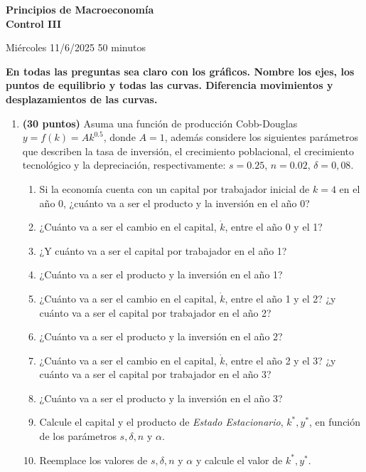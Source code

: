 \documentclass[11pt]{article}
\begin{document}
\begin{center}
{\Large\bfseries Principios de Macroeconomía}\\[2pt]
{\Large\bfseries Control III}
\end{center}

Miércoles 11/6/2025 \hfill 50 minutos

\textbf{En todas las preguntas sea claro con los gráficos. Nombre los ejes, los puntos de equilibrio y todas las curvas. Diferencia movimientos y desplazamientos de las curvas.}

\begin{enumerate}[leftmargin=*, itemsep=10pt]

\item \textbf{(30 puntos)} Asuma una función de producción Cobb-Douglas $y = f(k) = A k^{0.5}$, donde $A = 1$, además considere los siguientes parámetros que describen la tasa de inversión, el crecimiento poblacional, el crecimiento tecnológico y la depreciación, respectivamente: $s = 0.25$, $n = 0.02$, $\delta = 0{,}08$.

\begin{enumerate}[label=(\alph*), itemsep=3pt]
\item Si la economía cuenta con un capital por trabajador inicial de $k = 4$ en el año 0, ¿cuánto va a ser el producto y la inversión en el año 0?
\item ¿Cuánto va a ser el cambio en el capital, $\dot k$, entre el año 0 y el 1?
\item ¿Y cuánto va a ser el capital por trabajador en el año 1?
\item ¿Cuánto va a ser el producto y la inversión en el año 1?
\item ¿Cuánto va a ser el cambio en el capital, $\dot k$, entre el año 1 y el 2? ¿y cuánto va a ser el capital por trabajador en el año 2?
\item ¿Cuánto va a ser el producto y la inversión en el año 2?
\item ¿Cuánto va a ser el cambio en el capital, $\dot k$, entre el año 2 y el 3? ¿y cuánto va a ser el capital por trabajador en el año 3?
\item ¿Cuánto va a ser el producto y la inversión en el año 3?
\item Calcule el capital y el producto de \textit{Estado Estacionario}, $k^{*}, y^{*}$, en función de los parámetros $s, \delta, n$ y $\alpha$.
\item Reemplace los valores de $s, \delta, n$ y $\alpha$ y calcule el valor de $k^{*}, y^{*}$.
\end{enumerate}


\end{enumerate}
\end{document}
